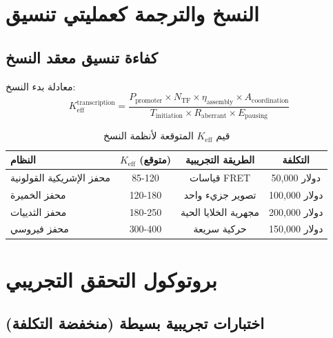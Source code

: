 \documentclass[11pt,a4paper]{article}
\begin{document}
	\section{النسخ والترجمة كعمليتي تنسيق}
	
	\subsection{كفاءة تنسيق معقد النسخ}
	
	معادلة بدء النسخ:
	\[
	K_{\text{eff}}^{\text{transcription}} = \frac{P_{\text{promoter}} \times N_{\text{TF}} \times \eta_{\text{assembly}} \times A_{\text{coordination}}}{T_{\text{initiation}} \times R_{\text{aberrant}} \times E_{\text{pausing}}}
	\]
	
	\begin{table}[H]
		\centering
		\caption{قيم $K_{\text{eff}}$ المتوقعة لأنظمة النسخ}
		\begin{tabular}{lccc}
			\toprule
			\textbf{النظام} & \textbf{$K_{\text{eff}}$ (متوقع)} & \textbf{الطريقة التجريبية} & \textbf{التكلفة} \\
			\midrule
			محفز الإشريكية القولونية & 85-120 & قياسات FRET & 50,000 دولار \\
			محفز الخميرة & 120-180 & تصوير جزيء واحد & 100,000 دولار \\
			محفز الثدييات & 180-250 & مجهرية الخلايا الحية & 200,000 دولار \\
			محفز فيروسي & 300-400 & حركية سريعة & 150,000 دولار \\
			\bottomrule
		\end{tabular}
	\end{table}
	
	\section{بروتوكول التحقق التجريبي}
	
	\subsection{اختبارات تجريبية بسيطة (منخفضة التكلفة)}
	
\end{document}
